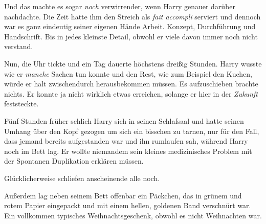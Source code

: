 Und das machte es sogar \emph{noch} verwirrender, wenn Harry genauer darüber nachdachte. Die Zeit hatte ihm den Streich als \emph{fait accompli} serviert und dennoch war es ganz eindeutig seiner eigenen Hände Arbeit. Konzept, Durchführung und Handschrift. Bis in jedes kleinste Detail, obwohl er viele davon immer noch nicht verstand.

Nun, die Uhr tickte und ein Tag dauerte höchstens dreißig Stunden. Harry wusste wie er \emph{manche} Sachen tun konnte und den Rest, wie zum Beispiel den Kuchen, würde er halt zwischendurch herausbekommen müssen. Es aufzuschieben brachte nichts. Er konnte ja nicht wirklich etwas erreichen, solange er hier in der \emph{Zukunft} feststeckte.

\later

Fünf Stunden früher schlich Harry sich in seinen Schlafsaal und hatte seinen Umhang über den Kopf gezogen um sich ein bisschen zu tarnen, nur für den Fall, dass jemand bereits aufgestanden war und ihn rumlaufen sah, während Harry noch im Bett lag. Er wollte niemandem sein kleines medizinisches Problem mit der Spontanen Duplikation erklären müssen.

Glücklicherweise schliefen anscheinende alle noch.

Außerdem lag neben seinem Bett offenbar ein Päckchen, das in grünem und rotem Papier eingepackt und mit einem hellen, goldenen Band verschnürt war. Ein vollkommen typisches Weihnachtsgeschenk, obwohl es nicht Weihnachten war.

